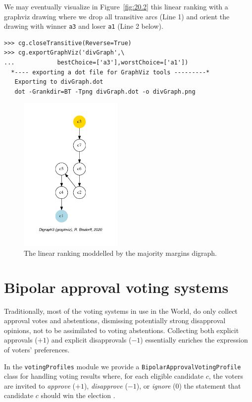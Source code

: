 We may eventually visualize in Figure~\vref{fig:20.2} this linear ranking with a graphviz drawing where we drop all transitive arcs (Line 1) and orient the drawing with \Condorcet winner \texttt{a3} and loser \texttt{a1} (Line 2 below).
\begin{lstlisting}
>>> cg.closeTransitive(Reverse=True)
>>> cg.exportGraphViz('divGraph',\
...            bestChoice=['a3'],worstChoice=['a1'])
  *---- exporting a dot file for GraphViz tools ---------*
   Exporting to divGraph.dot
   dot -Grankdir=BT -Tpng divGraph.dot -o divGraph.png
\end{lstlisting}
\begin{figure}[ht]
\sidecaption
\includegraphics[width=5cm]{Figures/20-2-divGraph.pdf}
\caption{The linear ranking moddelled by the majority margins digraph.} 
\label{fig:20.2}       %
\end{figure}


\section{Bipolar approval voting systems}
\label{sec:20.2}

Traditionally, most of the voting systems in use in the World, do only collect approval votes and abstentions, dismissing potentially strong disapproval opinions, not to be assimilated to voting abstentions. Collecting both explicit approvals ($+1$) and explicit disapprovals ($-1$) essentially enriches the expression of voters' preferences. 

In the \texttt{votingProfiles} module we provide a \texttt{BipolarApprovalVotingProfile} class for handling voting results where, for each eligible candidate $c$, the voters are invited  to \emph{approve} ($+1$), \emph{disapprove} ($-1$), or \emph{ignore} ($0$) the statement that candidate $c$ should win the election \citep{BAU-2012}.

